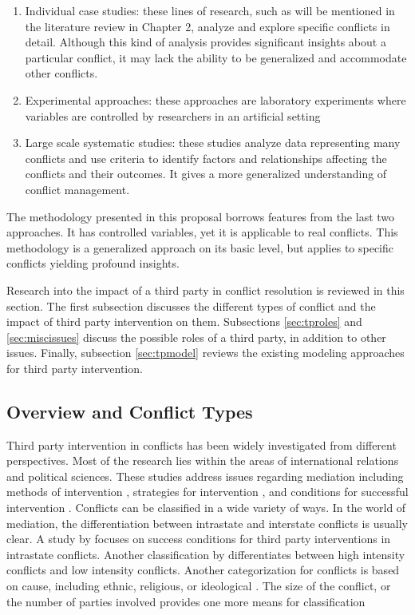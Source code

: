 \documentclass[letterpaper,12pt,titlepage,oneside,final]{book}
\begin{document}
\begin{enumerate}
\item Individual case studies: these lines of research, such as will be mentioned in the literature review in Chapter 2, analyze and explore specific conflicts in detail. Although this kind of analysis provides significant insights about a particular conflict, it may lack the ability to be generalized and accommodate other conflicts.
\item Experimental approaches: these approaches are laboratory experiments where variables are controlled by researchers in an artificial setting \citep{rubin1980,carnevale2005}
\item Large scale systematic studies: these studies analyze data representing many conflicts and use criteria to identify factors and relationships affecting the conflicts and their outcomes. It gives a more generalized understanding of conflict management.

\end{enumerate}

The methodology presented in this proposal borrows features from the last two approaches. It has controlled variables, yet it is applicable to real conflicts. This methodology is a generalized approach on its basic level, but applies to specific conflicts yielding profound insights.



Research into the impact of a third party in conflict resolution is reviewed in this section. The first subsection discusses the different types of conflict and the impact of third party intervention on them. Subsections \ref{sec:tproles} and \ref{sec:miscissues} discuss the possible roles of a third party, in addition to other issues. Finally, subsection \ref{sec:tpmodel} reviews the existing modeling approaches for third party intervention.

\subsection{Overview and Conflict Types}
\label{sec:ovrct}
Third party intervention in conflicts has been widely investigated from different perspectives. Most of the research lies within the areas of international relations and political sciences. These studies address  issues regarding mediation including methods of intervention \citep{fisher2001}, strategies for intervention \citep{prein1987}, and conditions for successful intervention \citep{regan1996}. 
Conflicts can be classified in a wide variety of ways. In the world of mediation, the differentiation between intrastate and interstate conflicts is usually clear. A study by \citet{regan1996} focuses on success conditions for third party interventions in intrastate conflicts. Another classification by \citet{bercovitch2006} differentiates between high intensity conflicts and low intensity conflicts. Another categorization for conflicts is based on cause, including ethnic, religious, or ideological \citep{regan1996}.  The size of the conflict, or the number of parties involved provides one more means for classification \citep{jehn1997}
\end{document}
